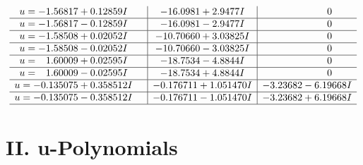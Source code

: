 \documentclass[1p]{elsarticle_modified}
\theoremstyle{definition}
\begin{document}
$$\begin{array}{c|c|c}
\begin{aligned}
u &= -1.56817 + 0.12859 I\end{aligned}
 & -16.0981 + 2.9477 I & \phantom{-0.000000 } 0 \\ \hline\begin{aligned}
u &= -1.56817 - 0.12859 I\end{aligned}
 & -16.0981 - 2.9477 I & \phantom{-0.000000 } 0 \\ \hline\begin{aligned}
u &= -1.58508 + 0.02052 I\end{aligned}
 & -10.70660 + 3.03825 I & \phantom{-0.000000 } 0 \\ \hline\begin{aligned}
u &= -1.58508 - 0.02052 I\end{aligned}
 & -10.70660 - 3.03825 I & \phantom{-0.000000 } 0 \\ \hline\begin{aligned}
u &= \phantom{-}1.60009 + 0.02595 I\end{aligned}
 & -18.7534 - 4.8844 I & \phantom{-0.000000 } 0 \\ \hline\begin{aligned}
u &= \phantom{-}1.60009 - 0.02595 I\end{aligned}
 & -18.7534 + 4.8844 I & \phantom{-0.000000 } 0 \\ \hline\begin{aligned}
u &= -0.135075 + 0.358512 I\end{aligned}
 & -0.176711 + 1.051470 I & -3.23682 - 6.19668 I \\ \hline\begin{aligned}
u &= -0.135075 - 0.358512 I\end{aligned}
 & -0.176711 - 1.051470 I & -3.23682 + 6.19668 I\\
 \hline 
 \end{array}$$\newpage
\newpage\renewcommand{\arraystretch}{1}
\centering \section*{ II. u-Polynomials}
\end{document}
